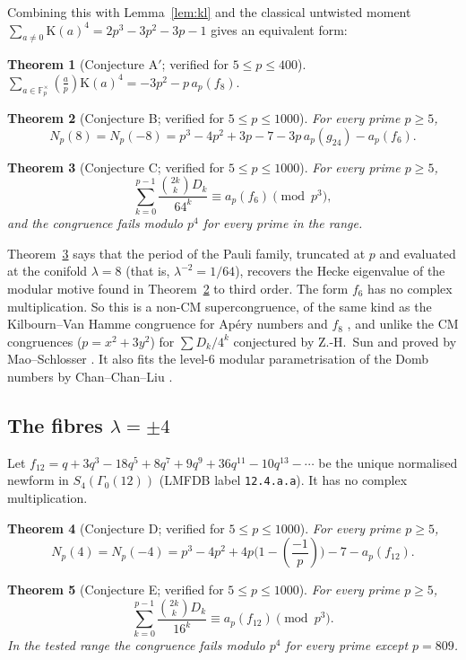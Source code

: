 \documentclass[11pt]{amsart}
\newtheorem{theorem}{Theorem}
\theoremstyle{definition}
\newcommand{\F}{\mathbb{F}}
\newcommand{\Kl}{\mathrm{K}}
\newcommand{\leg}[2]{\left(\frac{#1}{#2}\right)}
\begin{document}
\noindent Combining this with Lemma~\ref{lem:kl} and the classical untwisted moment $\sum_{a\ne0}\Kl(a)^4=2p^3-3p^2-3p-1$ gives an equivalent form:

\begin{theorem}[Conjecture A$'$; verified for $5\le p\le 400$]
$\displaystyle \sum_{a\in\F_p^\times}\leg ap\Kl(a)^4=-3p^2-p\,a_p(f_8).$
\end{theorem}

\begin{theorem}[Conjecture B; verified for $5\le p\le 1000$]\label{thm:B}
For every prime $p\ge5$,
\[ N_p(8)=N_p(-8)=p^3-4p^2+3p-7-3p\,a_p(g_{24})-a_p(f_6). \]
\end{theorem}

\begin{theorem}[Conjecture C; verified for $5\le p\le 1000$]\label{thm:C}
For every prime $p\ge5$,
\[ \sum_{k=0}^{p-1}\frac{\binom{2k}{k}D_k}{64^{k}}\equiv a_p(f_6)\pmod{p^3}, \]
and the congruence fails modulo $p^4$ for every prime in the range.
\end{theorem}

Theorem~\ref{thm:C} says that the period of the Pauli family, truncated at $p$ and evaluated at the conifold $\lambda=8$ (that is, $\lambda^{-2}=1/64$), recovers the Hecke eigenvalue of the modular motive found in Theorem~\ref{thm:B} to third order. The form $f_6$ has no complex multiplication. So this is a non-CM supercongruence, of the same kind as the Kilbourn--Van Hamme congruence for Ap\'ery numbers and $f_8$ \cite{Kilbourn}, and unlike the CM congruences ($p=x^2+3y^2$) for $\sum D_k/4^k$ conjectured by Z.-H.~Sun and proved by Mao--Schlosser \cite{MS}. It also fits the level-$6$ modular parametrisation of the Domb numbers by Chan--Chan--Liu \cite{CCL}.

\subsection*{The fibres $\lambda=\pm4$}
Let $f_{12}=q+3q^3-18q^5+8q^7+9q^9+36q^{11}-10q^{13}-\cdots$ be the unique normalised newform in $S_4(\Gamma_0(12))$ (LMFDB label \texttt{12.4.a.a}). It has no complex multiplication.

\begin{theorem}[Conjecture D; verified for $5\le p\le 1000$]\label{thm:D}
For every prime $p\ge5$,
\[ N_p(4)=N_p(-4)=p^3-4p^2+4p\Big(1-\leg{-1}{p}\Big)-7-a_p(f_{12}). \]
\end{theorem}

\begin{theorem}[Conjecture E; verified for $5\le p\le 1000$]\label{thm:E}
For every prime $p\ge5$,
\[ \sum_{k=0}^{p-1}\frac{\binom{2k}{k}D_k}{16^{k}}\equiv a_p(f_{12})\pmod{p^3}. \]
In the tested range the congruence fails modulo $p^4$ for every prime except $p=809$.
\end{theorem}
\end{document}
